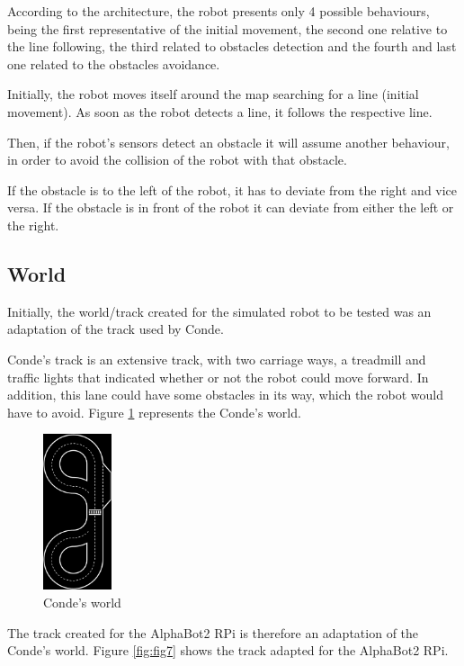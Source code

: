 \documentclass[conference]{IEEEtran}
\begin{document}
According to the architecture, the robot presents only 4 possible behaviours, being the first representative of the initial movement, the second one relative to the line following, the third related to obstacles detection and the fourth and last one related to the obstacles avoidance.

Initially, the robot moves itself around the map searching for a line (initial movement). As soon as the robot detects a line, it follows the respective line. 

Then, if the robot's sensors detect an obstacle it will assume another behaviour, in order to avoid the collision of the robot with that obstacle.

If the obstacle is to the left of the robot, it has to deviate from the right and vice versa. If the obstacle is in front of the robot it can deviate from either the left or the right.

\subsection{World} \label{world}

Initially, the world/track created for the simulated robot to be tested was an adaptation of the track used by Conde\cite{b1, b2, b3}.

Conde's track is an extensive track, with two carriage ways, a treadmill and traffic lights that indicated whether or not the robot could move forward. In addition, this lane could have some obstacles in its way, which the robot would have to avoid. Figure \ref{fig:fig6} represents the Conde's world.

\begin{figure}[H]
    \centering
    \includegraphics[width=2cm]{Conde-track.png}
    \caption{Conde's world}
    \label{fig:fig6}
\end{figure}

The track created for the AlphaBot2 RPi is therefore an adaptation of the Conde's world. Figure \ref{fig:fig7} shows the track adapted for the AlphaBot2 RPi.
\end{document}
